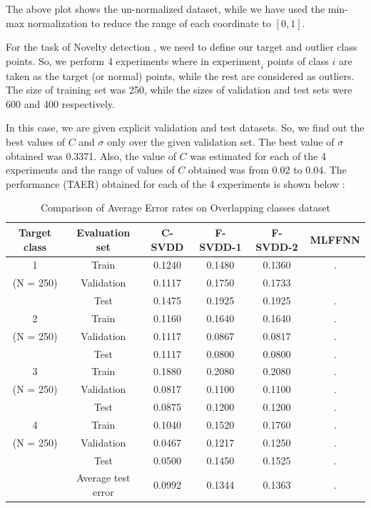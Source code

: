 \documentclass{article} %
\begin{document}
The above plot shows the un-normalized dataset, while we have used the min-max normalization to reduce the  range of each coordinate to $[0,1]$. 

For the task of Novelty detection , we need to define our target and outlier class points. So, we perform 4 experiments where in $\text{experiment}_{i}$ points of class $i$ are taken as the target (or normal) points, while the rest are considered as outliers. The size of training set was 250, while the sizes of validation and test sets were 600 and 400 respectively.

In this case, we are given explicit validation and test datasets. So, we find out the best values of $C$ and $\sigma$ only over the given validation set. The best value of $\sigma$ obtained was 0.3371. Also, the value of $C$ was estimated for each of the 4 experiments and the range of values of $C$ obtained was from 0.02 to 0.04.
The performance (TAER) obtained for each of the 4 experiments is shown below : \\[5pt]
\begin{table}[H]
\begin{center}
\caption{Comparison of Average Error rates on Overlapping classes dataset}
\begin{tabular}{|c|c|c|c|c|c|}
\hline
Target class & Evaluation set & C-SVDD & F-SVDD-1 & F-SVDD-2 & MLFFNN \\ \hline
 1 & Train & 0.1240 & 0.1480 & 0.1360 & . \\ 
 (N = 250) & Validation & 0.1117 & 0.1750 & 0.1733 &  \\ 
 & Test &  0.1475 & 0.1925 &  0.1925 & . \\ \hline
 
 2 & Train & 0.1160 & 0.1640 & 0.1640 & . \\ 
  (N = 250)& Validation &  0.1117  &  0.0867 &  0.0817 & . \\ 
 & Test &  0.1117  &  0.0800 & 0.0800  & . \\ \hline
 
 
 3 & Train & 0.1880 & 0.2080  & 0.2080 & . \\ 
 (N = 250) & Validation & 0.0817 & 0.1100 &  0.1100 & . \\ 
 & Test &  0.0875 &  0.1200 & 0.1200  & . \\ \hline
 
 
 4 & Train & 0.1040 & 0.1520 &  0.1760 & . \\ 
 (N = 250) & Validation &  0.0467 & 0.1217 & 0.1250 & . \\ 
 & Test & 0.0500 &  0.1450 &  0.1525 & . \\ \hline
 
& Average test error  &  0.0992 &  0.1344 & 0.1363 &. \\ \hline

\end{tabular} \\[10pt]
\end{center}

\end{table}
\end{document}
